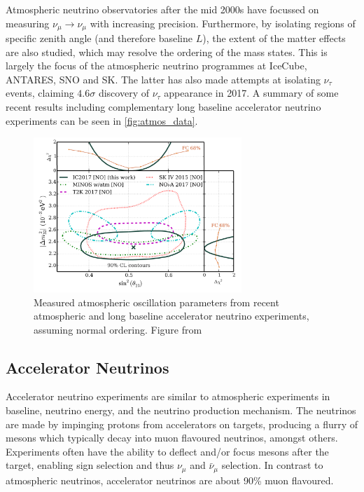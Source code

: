 Atmospheric neutrino observatories after the mid 2000s have focussed on measuring $\nu_\mu\rightarrow\nu_\mu$ with increasing precision. Furthermore, by isolating regions of specific zenith angle (and therefore baseline $L$), the extent of the matter effects are also studied, which may resolve the ordering of the mass states. This is largely the focus of the atmospheric neutrino programmes at IceCube\cite{icecube}, ANTARES\cite{antares}, SNO \cite{sno_atmos} and SK\cite{superk}. The latter has also made attempts at isolating $\nu_\tau$ events\cite{superk_tau}, claiming $4.6\sigma$ discovery of $\nu_\tau$ appearance in 2017. A summary of some recent results including complementary long baseline accelerator neutrino experiments can be seen in \autoref{fig:atmos_data}.
\begin{figure}[h]
	\includegraphics[width=0.7\textwidth, trim={0mm 0mm 0mm 0mm}, clip,page=1]{figures/theory/icecube_comp}
	\caption{Measured atmospheric oscillation parameters from recent atmospheric and long baseline accelerator neutrino experiments, assuming normal ordering. Figure from \cite{icecube}}
	\label{fig:atmos_data}
\end{figure}

\subsection{Accelerator Neutrinos}
Accelerator neutrino experiments are similar to atmospheric experiments in baseline, neutrino energy, and the neutrino production mechanism. The neutrinos are made by impinging protons from accelerators on targets, producing a flurry of mesons which typically decay into muon flavoured neutrinos, amongst others. Experiments often have the ability to deflect and/or focus mesons after the target, enabling sign selection and thus $\nu_\mu$ and $\bar{\nu}_\mu$ selection. In contrast to atmospheric neutrinos, accelerator neutrinos are about 90\% muon flavoured.

